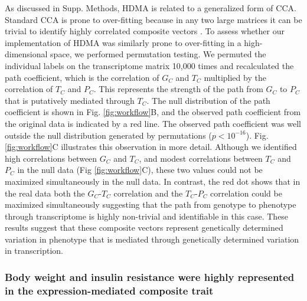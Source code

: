 \documentclass[
]{article}
\begin{document}
As discussed in Supp. Methods, HDMA is related to a generalized form of
CCA. Standard CCA is prone to over-fitting because in any two large
matrices it can be trivial to identify highly correlated composite
vectors \cite{pmid38383808}. To assess whether our implementation of
HDMA was similarly prone to over-fitting in a high-dimensional space, we
performed permutation testing. We permuted the individual labels on the
transcriptome matrix 10,000 times and recalculated the path coefficient,
which is the correlation of \(G_C\) and \(T_C\) multiplied by the
correlation of \(T_C\) and \(P_C\). This represents the strength of the
path from \(G_C\) to \(P_C\) that is putatively mediated through
\(T_C\). The null distribution of the path coefficient is shown in Fig.
\ref{fig:workflow}B, and the observed path coefficient from the original
data is indicated by a red line. The observed path coefficient was well
outside the null distribution generated by permutations
(\(p < 10^{-16}\)). Fig. \ref{fig:workflow}C illustrates this
observation in more detail. Although we identified high correlations
between \(G_C\) and \(T_C\), and modest correlations between \(T_C\) and
\(P_C\) in the null data (Fig \ref{fig:workflow}C), these two values
could not be maximized simultaneously in the null data. In contrast, the
red dot shows that in the real data both the \(G_C\)-\(T_C\) correlation
and the \(T_C\)-\(P_C\) correlation could be maximized simultaneously
suggesting that the path from genotype to phenotype through
transcriptome is highly non-trivial and identifiable in this case. These
results suggest that these composite vectors represent genetically
determined variation in phenotype that is mediated through genetically
determined variation in transcription.

\subsubsection{Body weight and insulin resistance were highly
represented in the expression-mediated composite
trait}\label{body-weight-and-insulin-resistance-were-highly-represented-in-the-expression-mediated-composite-trait}
\end{document}
